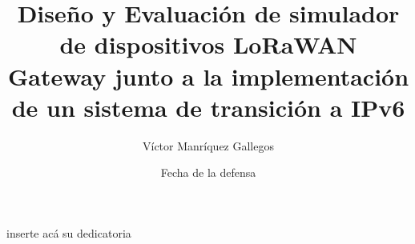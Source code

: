 \documentclass[thesis,final,oneside]{udpbook}
\begin{document}
\frontmatter
%
%

\begin{titlepage}                       
 \title{Diseño y Evaluación de simulador de dispositivos LoRaWAN Gateway junto a la implementación de un sistema de transición a IPv6}       %
\author{Víctor Manríquez Gallegos}               %
\date{Fecha de la defensa}              %
\end{titlepage}                         %
%
%
\begin{signaturepage}                   %
%
\end{signaturepage}                     %
%
%
\begin{dedicatory}                      %
inserte acá su dedicatoria              %
\end{dedicatory}                        %
%
%
\tableofcontents                        %
\listoffigures                          %
\listoftables                           %
%
\end{document}
